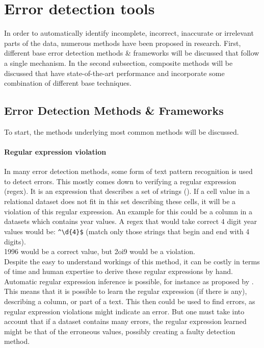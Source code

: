 \section{Error detection tools}
In order to automatically identify incomplete, incorrect, inaccurate or irrelevant parts of the data, numerous methods have been proposed in research. First, different base error detection methods \& frameworks will be discussed that follow a single mechanism. In the second subsection, composite methods will be discussed that have state-of-the-art performance and incorporate some combination of different base techniques.

\subsection{Error Detection Methods \& Frameworks}
To start, the methods underlying most common methods will be discussed.

\paragraph{Regular expression violation}
In many error detection methods, some form of text pattern recognition is used to detect errors. This mostly comes down to verifying a regular expression (regex). It is an expression that describes a set of strings (\cite{Mitkov2004-fz}). If a cell value in a relational dataset does not fit in this set describing these cells, it will be a violation of this regular expression. An example for this could be a column in a datasets which contains year values. A regex that would take correct 4 digit year values would be: \verb|^\d{4}$| (match only those strings that begin and end with 4 digits). 
\\1996 would be a correct value, but 2oi9 would be a violation. 
\\Despite the easy to understand workings of this method, it can be costly in terms of time and human expertise to derive these regular expressions by hand.
Automatic regular expression inference is possible, for instance as proposed by \cite{Bartoli2016-hx}. This means that it is possible to learn the regular expression (if there is any), describing a column, or part of a text. This then could be used to find errors, as regular expression violations might indicate an error. But one must take into account that if a dataset contains many errors, the regular expression learned might be that of the erroneous values, possibly creating a faulty detection method.
    
